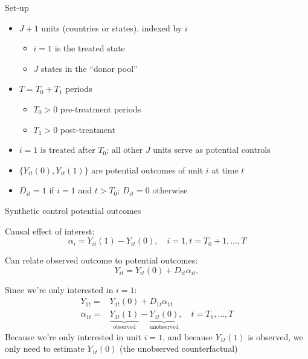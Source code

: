 \documentclass[compress, 8pt]{beamer}
\begin{document}
\begin{frame}{Set-up}

\begin{itemize}
    \item $J + 1$ units (countries or states), indexed by $i$
    \begin{itemize}
        \item $i=1$ is the treated state
        \item $J$ states in the ``donor pool''
    \end{itemize}

    \vspace{3ex}
    \item $T = T_0 + T_1$ periods
    \begin{itemize}
        \item $T_0 > 0$ pre-treatment periods
        \item $T_1 > 0$ post-treatment
    \end{itemize}

    \vspace{3ex}
    \item $i=1$ is treated after $T_0$; all other $J$ units serve as potential controls

    \vspace{3ex}
    \item $\{Y_{it} (0), Y_{it} (1)\}$ are potential outcomes of unit $i$ at time $t$ 

    \vspace{3ex}
    \item $D_{it} = 1$ if $i=1$ and $t>T_0$; $D_{it} =0$ otherwise
\end{itemize}

\end{frame}

\begin{frame}{Synthetic control potential outcomes}



Causal effect of interest:
\begin{equation*}
    \alpha_i = {Y_{it} (1)} - Y_{it} (0), \quad i=1, t=T_0 + 1, \dots, T
\end{equation*}


Can relate observed outcome to potential outcomes:
\begin{equation*}
    Y_{it} = Y_{it} (0) + D_{it} \alpha_{it},
\end{equation*}


Since we're only interested in $i=1$:
\begin{align*}
    Y_{1t} =& Y_{1t} (0) + D_{1t} \alpha_{1t} \\
    \alpha_{1t} 
    =& \underbrace{Y_{1t} (1)}_{\text{observed}} 
    - \underbrace{Y_{1t} (0)}_{\text{unobserved}}, \quad t=T_0, \dots, T
\end{align*}
Because we're only interested in unit $i=1$, and because $Y_{1t} (1)$ is observed, we only need to estimate $Y_{1t} (0)$ (the unobserved counterfactual)

\end{frame}
\end{document}
